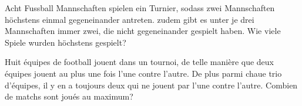 Acht Fussball Mannschaften spielen ein Turnier, sodass zwei Mannschaften höchstens einmal gegeneinander antreten. zudem gibt es unter je drei Mannschaften immer zwei, die nicht gegeneinander gespielt haben. Wie viele Spiele wurden höchstens gespielt?

\bigskip

Huit équipes de football jouent dans un tournoi, de telle manière que deux équipes jouent au plus une fois l'une contre l'autre. De plus parmi chaue trio d'équipes, il y en a toujours deux qui ne jouent par l'une contre l'autre. Combien de matchs sont joués au maximum?